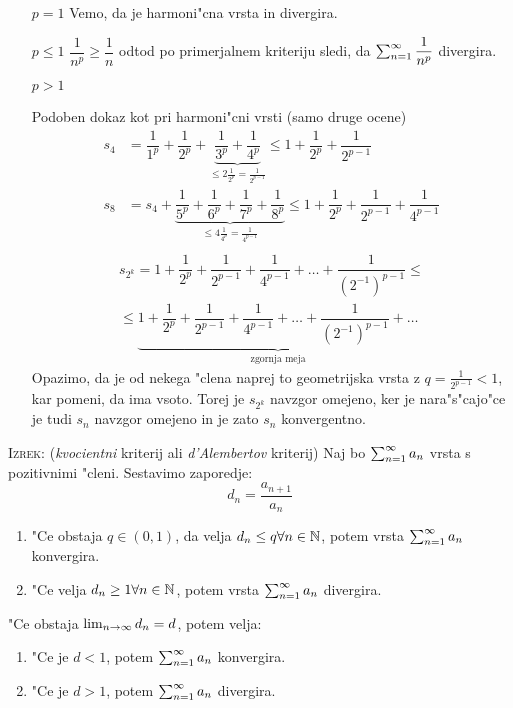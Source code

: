 \begin{itemize}
	\item[$p = 1$] Vemo, da je harmoni"cna vrsta in divergira.
	\item[$p \leq 1$] $\dfrac{1}{n^p} \geq \dfrac{1}{n}$ odtod po primerjalnem kriteriju sledi, da $\sum_{n = 1}^{\infty}\dfrac{1}{n^p}$ divergira.
	\item[$p > 1$] 
	
	Podoben dokaz kot pri harmoni"cni vrsti (samo druge ocene)
	\begin{align*}
	s_4 &= \dfrac{1}{1^p} + \dfrac{1}{2^p} + \underbrace{\dfrac{1}{3^p} + \dfrac{1}{4^p}}_{\leq 2\frac{1}{2^p} = \frac{1}{2^{p-1}}} \leq 1 + \dfrac{1}{2^p} + \dfrac{1}{2^{p-1}} \\
	s_8 &= s_4 + \underbrace{\dfrac{1}{5^p} + \dfrac{1}{6^p} + \dfrac{1}{7^p} + \dfrac{1}{8^p}}_{\leq 4 \frac{1}{4^p} = \frac{1}{4^{p-1}}} \leq 1 + \dfrac{1}{2^p} + \dfrac{1}{2^{p-1}} + \dfrac{1}{4^{p-1}} \\
	\end{align*}
	\begin{multline*}
		s_{2^k} = 1 + \dfrac{1}{2^p} + \dfrac{1}{2^{p-1}} + \dfrac{1}{4^{p-1}} + \ldots + \dfrac{1}{(2^{-1})^{p-1}} \leq \\
		\leq \underbrace{1 + \dfrac{1}{2^p} + \dfrac{1}{2^{p-1}} + \dfrac{1}{4^{p-1}} + \ldots + \dfrac{1}{(2^{-1})^{p-1}} + \ldots}_{\text{zgornja meja}}
	\end{multline*}
	Opazimo, da je od nekega "clena naprej to geometrijska vrsta z $q = \frac{1}{2^{p-1}} < 1$, kar pomeni, da ima vsoto. Torej je $s_{2^k}$ navzgor omejeno, ker je nara"s"cajo"ce je tudi $s_n$ navzgor omejeno in je zato $s_n$ konvergentno.
\end{itemize}
%
\textsc{Izrek:} (\emph{kvocientni} kriterij ali \emph{d'Alembertov} kriterij) Naj bo $\sum_{n = 1}^{\infty}a_n$ vrsta s pozitivnimi "cleni. Sestavimo zaporedje:
\begin{equation*}
d_n = \dfrac{a_{n+1}}{a_n}
\end{equation*}
\begin{enumerate}[1)]
	\item "Ce obstaja $q \in (0, 1)$, da velja $d_n \leq q \forall n \in \mathbb{N}$, potem vrsta $\sum_{n = 1}^{\infty}a_n$ konvergira.
	\item "Ce velja $d_n \geq 1 \forall n \in \mathbb{N}$, potem vrsta $\sum_{n = 1}^{\infty}a_n$ divergira.
\end{enumerate}
"Ce obstaja $\lim_{n \rightarrow \infty} d_n = d$, potem velja:
\begin{enumerate}[1')]
	\item "Ce je $d < 1$, potem $\sum_{n = 1}^{\infty} a_n$ konvergira.
	\item "Ce je $d > 1$, potem $\sum_{n = 1}^{\infty} a_n$ divergira.
\end{enumerate}
